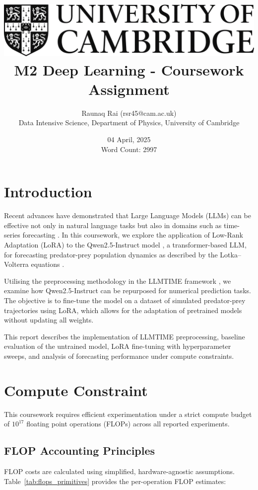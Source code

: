 \documentclass[a4paper,12pt]{article}
\title{
    \includegraphics[scale=0.4]{Cam_logo_bw.png}\\
    \vspace{0.5cm}
    M2 Deep Learning - Coursework Assignment
}
\author{Raunaq Rai (rsr45@cam.ac.uk)\\
    Data Intensive Science, Department of Physics, University of Cambridge
}
\date{04 April, 2025 \\ \vspace{0.2cm} {\small Word Count: 2997}}
\begin{document}
\maketitle

\section*{Introduction}

Recent advances have demonstrated that Large Language Models (LLMs) can be effective not only in natural language tasks but also in domains such as time-series forecasting \citep{gruver2023language}. In this coursework, we explore the application of Low-Rank Adaptation (LoRA) \citep{hu2021lora} to the Qwen2.5-Instruct model \citep{qwen2.5}, a transformer-based LLM, for forecasting predator-prey population dynamics as described by the Lotka–Volterra equations \citep{takeuchi2006lotka}.

Utilising the preprocessing methodology in the LLMTIME framework \citep{gruver2023language}, we examine how Qwen2.5-Instruct can be repurposed for numerical prediction tasks. The objective is to fine-tune the model on a dataset of simulated predator-prey trajectories using LoRA, which allows for the adaptation of pretrained models without updating all weights.

This report describes the implementation of LLMTIME preprocessing, baseline evaluation of the untrained model, LoRA fine-tuning with hyperparameter sweeps, and analysis of forecasting performance under compute constraints.

\section{Compute Constraint}

This coursework requires efficient experimentation under a strict compute budget of $10^{17}$ floating point operations (FLOPs) across all reported experiments.

\subsection*{FLOP Accounting Principles}

FLOP costs are calculated using simplified, hardware-agnostic assumptions. Table~\ref{tab:flops_primitives} provides the per-operation FLOP estimates:
\end{document}
